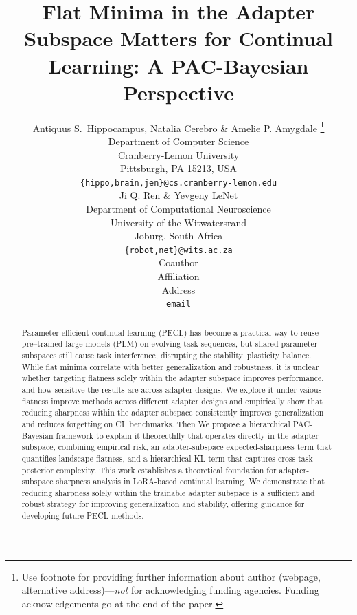 \documentclass{article} %
\title{Flat Minima in the Adapter Subspace Matters for Continual Learning: A PAC-Bayesian Perspective}
\author{Antiquus S.~Hippocampus, Natalia Cerebro \& Amelie P. Amygdale \thanks{ Use footnote for providing further information
about author (webpage, alternative address)---\emph{not} for acknowledging
funding agencies.  Funding acknowledgements go at the end of the paper.} \\
Department of Computer Science\\
Cranberry-Lemon University\\
Pittsburgh, PA 15213, USA \\
\texttt{\{hippo,brain,jen\}@cs.cranberry-lemon.edu} \\
\And
Ji Q. Ren \& Yevgeny LeNet \\
Department of Computational Neuroscience \\
University of the Witwatersrand \\
Joburg, South Africa \\
\texttt{\{robot,net\}@wits.ac.za} \\
\AND
Coauthor \\
Affiliation \\
Address \\
\texttt{email}
}
\begin{document}
\maketitle

\begin{abstract}
Parameter-efficient continual learning (PECL) has become a practical way to reuse pre–trained large models (PLM) on evolving task sequences, but shared parameter subspaces still cause task interference, disrupting the stability–plasticity balance. While flat minima correlate with better generalization and robustness, it is unclear whether targeting flatness solely within the adapter subspace improves performance, and how sensitive the results are across adapter designs.
We explore it under vaious flatness improve methods across different adapter designs and empirically show that reducing sharpness within the adapter subspace consistently improves generalization and reduces forgetting on CL benchmarks. Then We propose a hierarchical PAC-Bayesian framework to explain it theorecthlly that operates directly in the adapter subspace, combining empirical risk, an adapter-subspace expected-sharpness term that quantifies landscape flatness, and a hierarchical KL term that captures cross-task posterior complexity.  
This work establishes a theoretical foundation for adapter-subspace sharpness analysis in LoRA-based continual learning. We demonstrate that reducing sharpness solely within the trainable adapter subspace is a sufficient and robust strategy for improving generalization and stability, offering guidance for developing future PECL methods.












\end{abstract}
\end{document}
